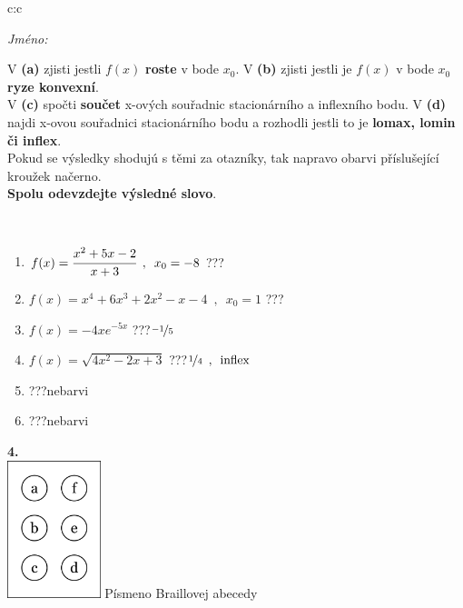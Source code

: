 \documentclass[10pt]{report}
\begin{document}
\begin{tabular}{c:c}
\begin{minipage}[c][104.5mm][t]{0.5\linewidth}
\begin{center}
\textit{Jméno:}\phantom{xxxxxxxxxxxxxxxxxxxxxxxxxxxxxxxxxxxxxxxxxxxxxxxxxxxxxxxxxxxxxxxxx}\\[5mm]
\begin{minipage}{0.95\linewidth}
\begin{center}
{\small V \textbf{(a)} zjisti jestli $f(x)$ \textbf{roste} v bode $x_0$. V \textbf{(b)} zjisti jestli je $f(x)$ v bode $x_0$ \textbf{ryze konvexní}.\\V \textbf{(c)} spočti \textbf{součet} x-ových souřadnic stacionárního a inflexního bodu. V \textbf{(d)} najdi x-ovou souřadnici stacionárního bodu a rozhodli jestli to je \textbf{lomax, lomin či inflex}.\\Pokud se výsledky shodujú s těmi za otazníky, tak napravo obarvi příslušející kroužek načerno.\\\textbf{Spolu odevzdejte výsledné slovo}}.
\end{center}
\end{minipage}
\\[1mm]
\begin{minipage}{0.79\linewidth}
\begin{center}
\begin{varwidth}{\linewidth}
\begin{enumerate}
\normalsize
\item $f(x)=\cfrac{x^2+5x-2}{x+3}\enspace , \enspace x_0=-8$\quad \dotfill\; ???\;\dotfill \quad {}
\item $f(x)=x^4+6x^3+2x^2-x-4\enspace , \enspace x_0=1$\quad \dotfill\; ???\;\dotfill \quad {}
\item $f(x)=-4xe^{-5x}$\quad \dotfill\; ???\;\dotfill \quad $\nicefrac{-1}{5}$
\item $f(x)=\sqrt{4x^2-2x+3}$\quad \dotfill\; ???\;\dotfill \quad $\nicefrac{1}{4}\enspace , \enspace\mathrm{inflex}$
\item \quad \dotfill\; ???\;\dotfill \quad nebarvi
\item \quad \dotfill\; ???\;\dotfill \quad nebarvi
\end{enumerate}
\end{varwidth}
\end{center}
\end{minipage}
\begin{minipage}{0.20\linewidth}
\begin{center}
{\Huge\bfseries 4.} \\[2mm]
\includegraphics[height=40mm]{../images/braille.png}
{\small Písmeno Braillovej abecedy}
\end{center}
\end{minipage}
\end{center}
\end{minipage}
%
\end{tabular}
\end{document}
